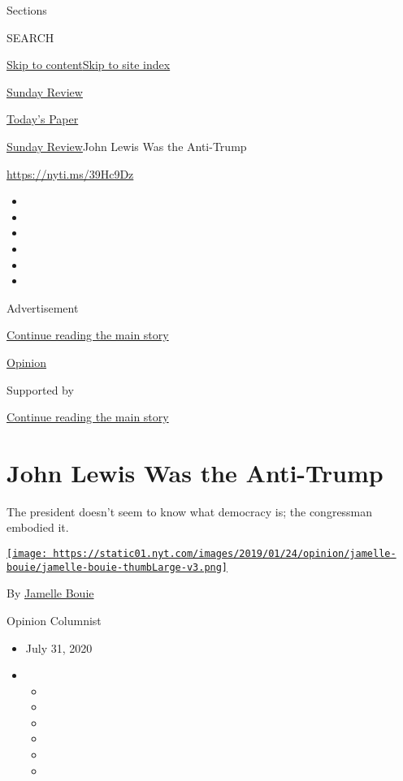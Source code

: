 Sections

SEARCH

\protect\hyperlink{site-content}{Skip to
content}\protect\hyperlink{site-index}{Skip to site index}

\href{https://www.nytimes.com/section/opinion/sunday}{Sunday Review}

\href{https://myaccount.nytimes.com/auth/login?response_type=cookie\&client_id=vi}{}

\href{https://www.nytimes.com/section/todayspaper}{Today's Paper}

\href{/section/opinion/sunday}{Sunday Review}\textbar{}John Lewis Was
the Anti-Trump

\url{https://nyti.ms/39Hc9Dz}

\begin{itemize}
\item
\item
\item
\item
\item
\item
\end{itemize}

Advertisement

\protect\hyperlink{after-top}{Continue reading the main story}

\href{/section/opinion}{Opinion}

Supported by

\protect\hyperlink{after-sponsor}{Continue reading the main story}

\hypertarget{john-lewis-was-the-anti-trump}{%
\section{John Lewis Was the
Anti-Trump}\label{john-lewis-was-the-anti-trump}}

The president doesn't seem to know what democracy is; the congressman
embodied it.

\href{https://www.nytimes.com/column/jamelle-bouie}{\texttt{[image: https://static01.nyt.com/images/2019/01/24/opinion/jamelle-bouie/jamelle-bouie-thumbLarge-v3.png]}}

By \href{https://www.nytimes.com/column/jamelle-bouie}{Jamelle Bouie}

Opinion Columnist

\begin{itemize}
\item
  July 31, 2020
\item
  \begin{itemize}
  \item
  \item
  \item
  \item
  \item
  \item
  \end{itemize}
\end{itemize}

